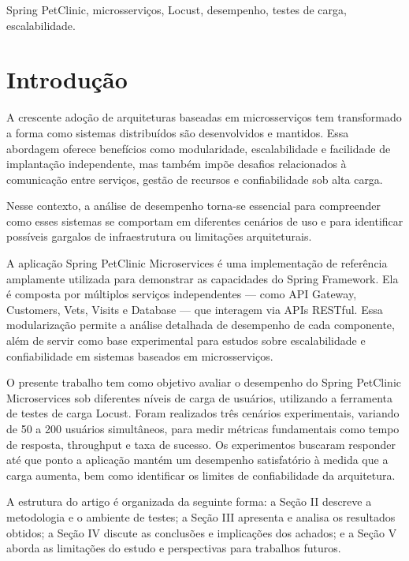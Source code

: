 \documentclass[conference]{IEEEtran}
\begin{document}
    \begin{IEEEkeywords}
       Spring PetClinic, microsserviços, Locust, desempenho, testes de carga, escalabilidade.
    \end{IEEEkeywords}

    \section{Introdução}
    A crescente adoção de arquiteturas baseadas em microsserviços tem transformado a forma como sistemas distribuídos são desenvolvidos e mantidos. Essa abordagem oferece benefícios como modularidade, escalabilidade e facilidade de implantação independente, mas também impõe desafios relacionados à comunicação entre serviços, gestão de recursos e confiabilidade sob alta carga.
    
    Nesse contexto, a análise de desempenho torna-se essencial para compreender como esses sistemas se comportam em diferentes cenários de uso e para identificar possíveis gargalos de infraestrutura ou limitações arquiteturais.

    A aplicação Spring PetClinic Microservices é uma implementação de referência amplamente utilizada para demonstrar as capacidades do Spring Framework. Ela é composta por múltiplos serviços independentes — como API Gateway, Customers, Vets, Visits e Database — que interagem via APIs RESTful. Essa modularização permite a análise detalhada de desempenho de cada componente, além de servir como base experimental para estudos sobre escalabilidade e confiabilidade em sistemas baseados em microsserviços.

    O presente trabalho tem como objetivo avaliar o desempenho do Spring PetClinic Microservices sob diferentes níveis de carga de usuários, utilizando a ferramenta de testes de carga Locust. Foram realizados três cenários experimentais, variando de 50 a 200 usuários simultâneos, para medir métricas fundamentais como tempo de resposta, throughput e taxa de sucesso. Os experimentos buscaram responder até que ponto a aplicação mantém um desempenho satisfatório à medida que a carga aumenta, bem como identificar os limites de confiabilidade da arquitetura.
    
    A estrutura do artigo é organizada da seguinte forma: a Seção II descreve a metodologia e o ambiente de testes; a Seção III apresenta e analisa os resultados obtidos; a Seção IV discute as conclusões e implicações dos achados; e a Seção V aborda as limitações do estudo e perspectivas para trabalhos futuros.
\end{document}
